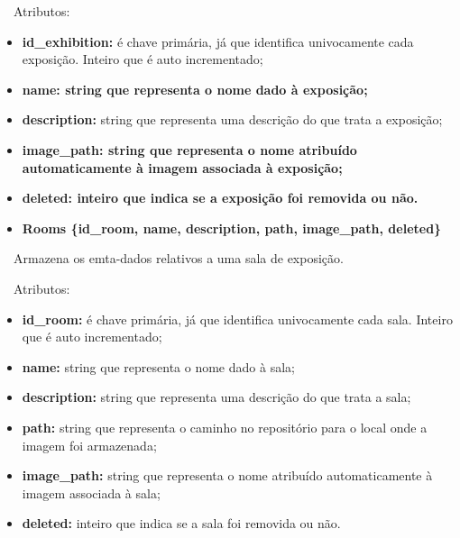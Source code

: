 \documentclass[letterpaper]{article}
\newcommand\liststyleLxvii{%
\renewcommand\labelitemi{[27A2?]}
\renewcommand\labelitemii{[27A2?]}
\renewcommand\labelitemiii{[27A2?]}
\renewcommand\labelitemiv{[27A2?]}
}
\newcommand\liststyleLxviii{%
\renewcommand\labelitemi{{\textbullet}}
\renewcommand\labelitemii{{\textbullet}}
\renewcommand\labelitemiii{{\textbullet}}
\renewcommand\labelitemiv{{\textbullet}}
}
\newcommand\liststyleLxix{%
\renewcommand\labelitemi{[27A2?]}
\renewcommand\labelitemii{[27A2?]}
\renewcommand\labelitemiii{[27A2?]}
\renewcommand\labelitemiv{[27A2?]}
}
\begin{document}
\bigskip

{
\ \ Atributos:}

\liststyleLxvii
\begin{itemize}
\item {
\textbf{id\_exhibition: }\'e chave prim\'aria, j\'a que identifica
univocamente cada exposi\c{c}\~ao. Inteiro que \'e auto incrementado;}
\item {\bfseries
name:\textmd{ string que representa o nome dado \`a exposi\c{c}\~ao;}}
\item {
\textbf{description: }string que representa uma descri\c{c}\~ao do que
trata a exposi\c{c}\~ao;}
\item {\bfseries
image\_path:\textmd{ string que representa o nome atribu\'ido
automaticamente \`a imagem associada \`a exposi\c{c}\~ao;}}
\item {\bfseries
deleted:\textmd{ inteiro que indica se a exposi\c{c}\~ao foi removida ou
n\~ao.}}
\end{itemize}

\bigskip

\liststyleLxviii
\begin{itemize}
\item {\bfseries
Rooms\textmd{ \{}\textmd{id\_room}\textmd{, name, description, path,
image\_path, deleted\}}}
\end{itemize}
{
\ \ Armazena os emta-dados relativos a uma sala de exposi\c{c}\~ao.}


\bigskip

{
\ \ Atributos:}

\liststyleLxix
\begin{itemize}
\item {
\textbf{id\_room:} \'e chave prim\'aria, j\'a que identifica
univocamente cada sala. Inteiro que \'e auto incrementado;}
\item {
\textbf{name:} string que representa o nome dado \`a sala;}
\item {
\textbf{description:} string que representa uma descri\c{c}\~ao do que
trata a sala;}
\item {
\textbf{path:} string que representa o caminho no reposit\'orio para o
local onde a imagem foi armazenada;}
\item {
\textbf{image\_path:} string que representa o nome atribu\'ido
automaticamente \`a imagem associada \`a sala;}
\item {
\textbf{deleted:} inteiro que indica se a sala foi removida ou
n\~ao.\ \ }
\end{itemize}
\end{document}
